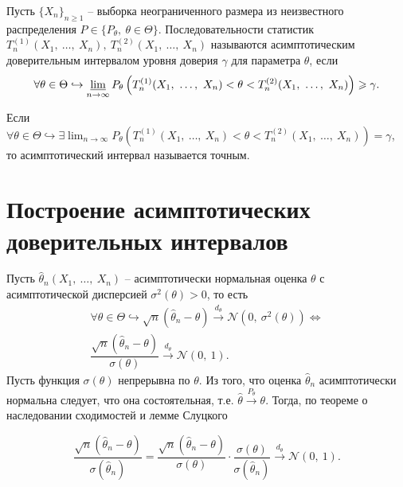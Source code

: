 \begin{definition}
    Пусть $\displaystyle \{X_{n}\}_{n\geqslant 1}$ -- выборка неограниченного размера из неизвестного распределения $\displaystyle P\in \{P_{\theta } ,\ \theta \in \Theta \}$. Последовательности статистик $\displaystyle T_{n}^{( 1)}( X_{1} ,\ \dotsc ,\ X_{n}) ,\ T_{n}^{( 2)}( X_{1} ,\ \dotsc ,\ X_{n})$ называются асимптотическим доверительным интервалом уровня доверия $\displaystyle \gamma $ для параметра $\displaystyle \theta $, если
    \begin{equation*}
        \forall \theta \in \Theta \hookrightarrow \varliminf _{n\rightarrow \infty } P_{\theta }\left( T_{n}^{( 1)}( X_{1} ,\ \dotsc ,\ X_{n}) < \theta < T_{n}^{( 2)}( X_{1} ,\ \dotsc ,\ X_{n})\right) \geqslant \gamma .
    \end{equation*}
\end{definition}
Если $\displaystyle \forall \theta \in \Theta \hookrightarrow \exists \lim _{n\rightarrow \infty } P_{\theta }\left( T_{n}^{( 1)}( X_{1} ,\ \dotsc ,\ X_{n}) < \theta < T_{n}^{( 2)}( X_{1} ,\ \dotsc ,\ X_{n})\right) =\gamma $, то асимптотический интервал называется точным.
\section{Построение асимптотических доверительных интервалов}

Пусть $\displaystyle \hat{\theta }_{n}( X_{1} ,\ \dotsc ,\ X_{n})$ -- асимптотически нормальная оценка $\displaystyle \theta $ с асимптотической дисперсией $\displaystyle \sigma ^{2}( \theta )  >0$, то есть
\begin{gather*}
    \forall \theta \in \Theta \hookrightarrow \sqrt{n}(\hat{\theta }_{n} -\theta )\xrightarrow{d_{\theta }}\mathcal{N}\left( 0,\ \sigma ^{2}( \theta )\right) \Leftrightarrow \\
    \dfrac{\sqrt{n}(\hat{\theta }_{n} -\theta )}{\sigma ( \theta )}\xrightarrow{d_{\theta }}\mathcal{N}( 0,\ 1) .
\end{gather*}
Пусть функция $\displaystyle \sigma ( \theta )$ непрерывна по $\displaystyle \theta $. Из того, что оценка $\displaystyle \hat{\theta }_{n}$ асимптотически нормальна следует, что она состоятельная, т.е. $\displaystyle \hat{\theta }\xrightarrow{P_{\theta }} \theta $. Тогда, по теореме о наследовании сходимостей и лемме Слуцкого


\begin{equation*}
    \dfrac{\sqrt{n}(\hat{\theta }_{n} -\theta )}{\sigma (\hat{\theta }_{n})} =\dfrac{\sqrt{n}(\hat{\theta }_{n} -\theta )}{\sigma ( \theta )} \cdotp \dfrac{\sigma ( \theta )}{\sigma (\hat{\theta }_{n})}\xrightarrow{d_{\theta }}\mathcal{N}( 0,\ 1) .
\end{equation*}


